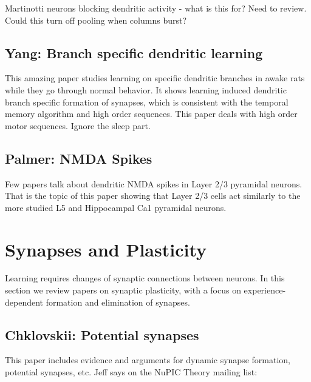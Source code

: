 \documentclass{article} %
\begin{document}
Martinotti neurons blocking dendritic activity - what is this for? Need to
review. Could this turn off pooling when columns burst?


\subsection{Yang: Branch specific dendritic learning}

This amazing paper \cite{Yang2014} studies learning on specific dendritic
branches in awake rats while they go through normal behavior. It shows learning
induced dendritic branch specific formation of synapses, which is consistent
with the temporal memory algorithm and high order sequences. This paper deals
with high order motor sequences. Ignore the sleep part.

\subsection{Palmer: NMDA Spikes}

Few papers talk about dendritic NMDA spikes in Layer 2/3 pyramidal neurons.
That is the topic of this paper \cite{Palmer2014} showing that Layer 2/3 cells
act similarly to the more studied L5 and Hippocampal Ca1 pyramidal neurons.

\section{Synapses and Plasticity}

Learning requires changes of synaptic connections between neurons. In this
section we review papers on synaptic plasticity, with a focus on
experience-dependent formation and elimination of synapses.

\subsection{Chklovskii: Potential synapses}

This paper \cite{Chklovskii2004} includes evidence and arguments for dynamic
synapse formation,  potential synapses, etc. Jeff says on the NuPIC Theory
mailing list:
\end{document}
